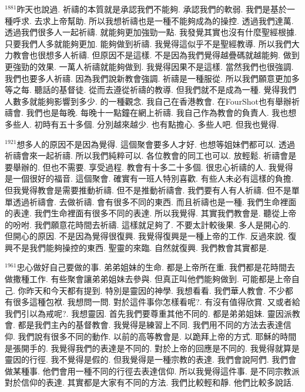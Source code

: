 \documentclass{book}
\begin{document}
$^{1881}$昨天也說過.
祈禱的本質就是承認我們不能夠.
承認我們的軟弱.
我們是基於一種呼求.
去求上帝幫助.
所以我想祈禱也是一種不能夠成為的操控.
透過我們達萬.
透過我們很多人一起祈禱.
就能夠更加強勁一點.
我發覺其實也沒有什麼聖經根據.
只要我們人多就能夠更加.
能夠做到祈禱.
我覺得這似乎不是聖經教導.
所以我們大力教會也很想多人祈禱.
但原因不是這樣.
不是因為我們覺得越疊碼就越能夠.
做到更強勁的效果.
一萬人祈禱就能夠做到.
我覺得因果不是這樣.
當然我們也很強調.
我們也要多人祈禱.
因為我們說新教會強調.
祈禱是一種服從.
所以我們願意更加多等之每.
聽話的基督徒.
從而去遵從祈禱的教導.
但我們就不是成為一種.
覺得我們人數多就能夠影響到多少.
的一種觀念.
我自己在香港教會.
在FourShot也有舉辦祈禱會.
我們也是每晚.
每晚十一點鐘在網上祈禱.
我自己作為教會的負責人.
我也想多些人.
初時有五十多個.
分別越來越少.
也有點擔心.
多些人吧.
但我也覺得.

$^{1921}$想多人的原因不是因為覺得.
這個聚會要多人才好.
也想等姐妹們都可以.
透過祈禱會來一起祈禱.
所以我們純粹可以.
各位教會的同工也可以.
放輕鬆.
祈禱會是要舉辦的.
但也不需要.
享受過程.
教會有十多二十多個.
很忠心祈禱的人.
我覺得是一個很好的福音.
這個聚會.
確實有一班人特別喜歡.
有些人未必有這樣的負擔.
但我覺得教會是需要推動祈禱.
但不是推動祈禱會.
我們要有人有人祈禱.
但不是單單透過祈禱會.
去做祈禱.
會有很多不同的東西.
而且祈禱也是一種.
我們生命裡面的表達.
我們生命裡面有很多不同的表達.
所以我覺得.
其實我們教會是.
聽從上帝的吩咐.
我們願意花時間去祈禱.
這樣就足夠了.
不要太計較後果.
多人是開心的.
但開心的原因.
不是因為覺得很復興.
我覺得復興是一種上帝的工作.
反過來說.
復興不是我們能夠操控的東西.
聖靈的來臨.
自然就復興.
我們教會其實都是.

$^{1961}$忠心做好自己要做的事.
弟弟姐妹的生命.
都是上帝所在重.
我們都是花時間去做撒種工作.
有些聚會讓弟弟姐妹去參與.
但真正叫他們能夠做到.
可能都是上帝自己.
你昨天和今天都有提到.
特別是靈因的神學.
我想看看.
我們華人教會.
不少都有很多這種包袱.
我想問一問.
對於這件事你怎樣看呢?.
有沒有值得欣賞.
又或者給我們引以為戒呢?.
我想靈因.
首先我們要尊重其他不同的.
都是弟弟姐妹.
靈因派教會.
都是我們主內的基督教會.
我覺得是練習上不同.
我們用不同的方法去表達信仰.
我們說有很多不同的動作.
以前的高等教會是.
以跪拜上帝的方式.
耶穌的時間是張開手的.
我覺得我們的表達是不同的.
對於上帝的回應是不同的.
我覺得就算是靈因的行徑.
我不覺得是假的.
但我覺得是一種宗教的表達.
我們會說阿們.
我們會做某種事.
他們會用一種不同的行徑去表達信仰.
所以我覺得這件事.
是不同宗教派對於信仰的表達.
其實都是大家有不同的方法.
我們比較輕和靜.
他們比較多說話.
\end{document}
